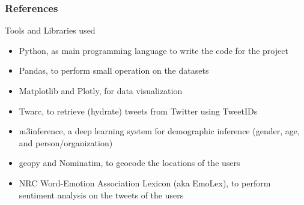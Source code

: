 \documentclass[8pt]{beamer}  %
\begin{document}
\begin{frame}
        \frametitle{References}
        \printbibliography
\end{frame}












\begin{frame}{Tools and Libraries used}

    \begin{itemize}
        \item Python, as main programming language to write the code for the project
        \item Pandas, to perform small operation on the datasets
        \item Matplotlib and Plotly, for data visualization
        \item Twarc, to retrieve (hydrate) tweets from Twitter using TweetIDs
        \item m3inference, a deep learning system for demographic inference (gender, age, and person/organization)
        \item geopy and Nominatim, to geocode the locations of the users
        \item NRC Word-Emotion Association Lexicon (aka EmoLex), to perform sentiment analysis on the tweets of the users
    \end{itemize}
    
\end{frame}
\end{document}
